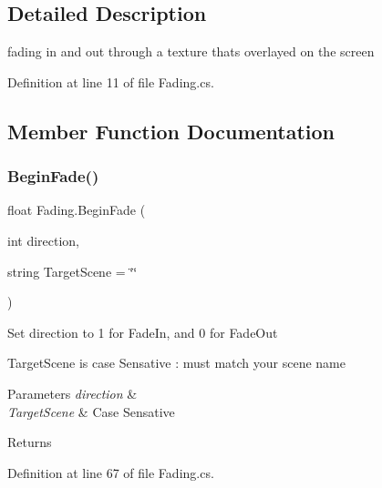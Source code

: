 \subsection{Detailed Description}
fading in and out through a texture that\textquotesingle{}s overlayed on the screen 



Definition at line 11 of file Fading.\+cs.



\subsection{Member Function Documentation}
\mbox{\label{class_fading_a1de56a8439ac7fe269d28b560e43a170}} 
\subsubsection{\texorpdfstring{Begin\+Fade()}{BeginFade()}\hspace{0.1cm}{\footnotesize\ttfamily [1/2]}}
{\footnotesize\ttfamily float Fading.\+Begin\+Fade (\begin{DoxyParamCaption}\item[{int}]{direction,  }\item[{string}]{Target\+Scene = {\ttfamily \char`\"{}\char`\"{}} }\end{DoxyParamCaption})}





Set direction to 1 for Fade\+In, and 0 for Fade\+Out 

Target\+Scene is case Sensative \+: must match your scene name 


\begin{DoxyParams}{Parameters}
{\em direction} & \\
\hline
{\em Target\+Scene} & Case Sensative\\
\hline
\end{DoxyParams}
\begin{DoxyReturn}{Returns}

\end{DoxyReturn}


Definition at line 67 of file Fading.\+cs.

\mbox{\label{class_fading_aad79c9805adb309dfca9c35956a6539f}} 
